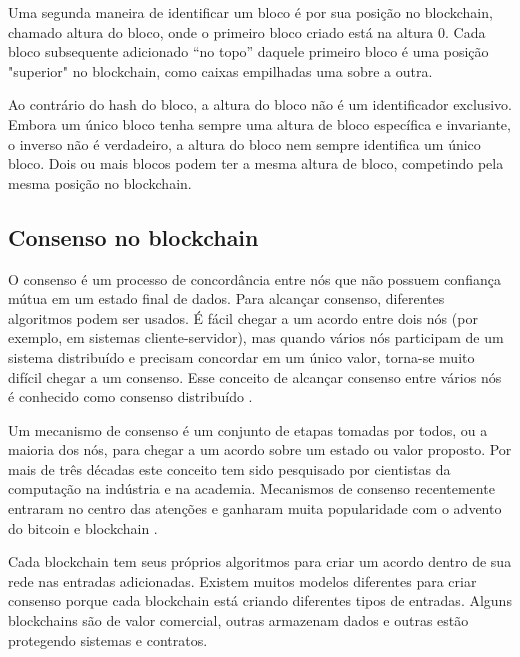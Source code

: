     Uma segunda maneira de identificar um bloco é por sua posição no blockchain, chamado altura do bloco, onde o primeiro bloco criado está na altura 0. Cada bloco subsequente adicionado “no topo” daquele primeiro bloco é uma posição "superior" no blockchain, como caixas empilhadas uma sobre a outra.\cite{mastering_blockchain_andreas}

    Ao contrário do hash do bloco, a altura do bloco não é um identificador exclusivo. Embora um único bloco tenha sempre uma altura de bloco específica e invariante, o inverso não é verdadeiro, a altura do bloco nem sempre identifica um único bloco. Dois ou mais blocos podem ter a mesma altura de bloco, competindo pela mesma posição no blockchain.
    
    
    
    \subsection{Consenso no blockchain}

        O consenso é um processo de concordância entre nós que não possuem confiança mútua em um estado final de dados. Para alcançar consenso, diferentes algoritmos podem ser usados. É fácil chegar a um acordo entre dois nós (por exemplo, em sistemas cliente-servidor), mas quando vários nós participam de um sistema distribuído e precisam concordar em um único valor, torna-se muito difícil chegar a um consenso. Esse conceito de alcançar consenso entre vários nós é conhecido como consenso distribuído \cite{mastering_blockchain}.
        
        Um mecanismo de consenso é um conjunto de etapas tomadas por todos, ou a maioria dos nós, para chegar a um acordo sobre um estado ou valor proposto. Por mais de três décadas este conceito tem sido pesquisado por cientistas da computação na indústria e na academia. Mecanismos de consenso recentemente entraram no centro das atenções e ganharam muita popularidade com o advento do bitcoin e blockchain \cite{mastering_blockchain}.
        
        Cada blockchain tem seus próprios algoritmos para criar um acordo dentro de sua rede nas entradas adicionadas. Existem muitos modelos diferentes para criar consenso porque cada blockchain está criando diferentes tipos de entradas. Alguns blockchains são de valor comercial, outras armazenam dados e outras estão protegendo sistemas e contratos.\cite{blockchain_for_dummies}
        
